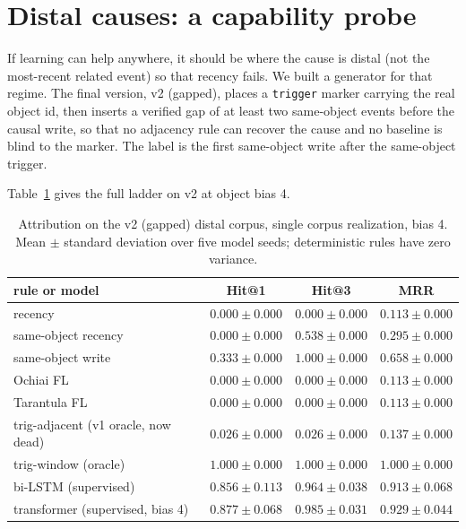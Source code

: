 \documentclass[11pt]{article}
\newcommand{\code}[1]{\texttt{#1}}
\begin{document}
\section{Distal causes: a capability probe}

If learning can help anywhere, it should be where the cause is distal (not the most-recent related event) so that recency fails. We built a generator for that regime. The final version, v2 (gapped), places a \code{trigger} marker carrying the real object id, then inserts a verified gap of at least two same-object events before the causal write, so that no adjacency rule can recover the cause and no baseline is blind to the marker. The label is the first same-object write after the same-object trigger.

Table~\ref{tab:ladder} gives the full ladder on v2 at object bias 4.

\begin{table}[t]
  \centering
  \caption{Attribution on the v2 (gapped) distal corpus, single corpus realization, bias 4. Mean $\pm$ standard deviation over five model seeds; deterministic rules have zero variance.}
  \label{tab:ladder}
  \begin{tabular}{lccc}
    \toprule
    rule or model & Hit@1 & Hit@3 & MRR \\
    \midrule
    recency & $0.000 \pm 0.000$ & $0.000 \pm 0.000$ & $0.113 \pm 0.000$ \\
    same-object recency & $0.000 \pm 0.000$ & $0.538 \pm 0.000$ & $0.295 \pm 0.000$ \\
    same-object write & $0.333 \pm 0.000$ & $1.000 \pm 0.000$ & $0.658 \pm 0.000$ \\
    Ochiai FL & $0.000 \pm 0.000$ & $0.000 \pm 0.000$ & $0.113 \pm 0.000$ \\
    Tarantula FL & $0.000 \pm 0.000$ & $0.000 \pm 0.000$ & $0.113 \pm 0.000$ \\
    trig-adjacent (v1 oracle, now dead) & $0.026 \pm 0.000$ & $0.026 \pm 0.000$ & $0.137 \pm 0.000$ \\
    trig-window (oracle) & $\mathbf{1.000 \pm 0.000}$ & $1.000 \pm 0.000$ & $1.000 \pm 0.000$ \\
    bi-LSTM (supervised) & $0.856 \pm 0.113$ & $0.964 \pm 0.038$ & $0.913 \pm 0.068$ \\
    transformer (supervised, bias 4) & $0.877 \pm 0.068$ & $0.985 \pm 0.031$ & $0.929 \pm 0.044$ \\
    \bottomrule
  \end{tabular}
\end{table}
\end{document}
